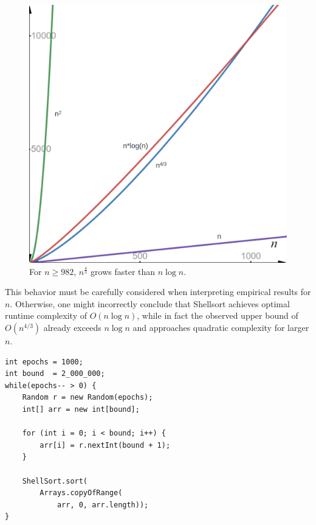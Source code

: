 \begin{figure}[!h]
    \centering
    \includegraphics[width=1\columnwidth]{img/lognplot}
    \caption{For $n \geq 982$, $n^{\frac{4}{3}}$ grows faster than $n \log n$.}
    \label{fig:lognplot}
\end{figure}

\noindent
This behavior must be carefully considered when interpreting empirical results for $n$.
Otherwise, one might incorrectly conclude that Shellsort achieves optimal runtime complexity of $O(n \log n)$, while in fact the observed upper bound of $O(n^{4/3})$ already exceeds $n \log n$ and approaches quadratic complexity for larger $n$.



\vspace{4mm}
\begin{lstlisting}[style=javastyle, caption={Code for Shellsort-testing large randomized arrays.}, label=lst:rand]
int epochs = 1000;
int bound  = 2_000_000;
while(epochs-- > 0) {
    Random r = new Random(epochs);
    int[] arr = new int[bound];

    for (int i = 0; i < bound; i++) {
        arr[i] = r.nextInt(bound + 1);
    }

    ShellSort.sort(
        Arrays.copyOfRange(
            arr, 0, arr.length));
}
\end{lstlisting}
\vspace{4mm}


